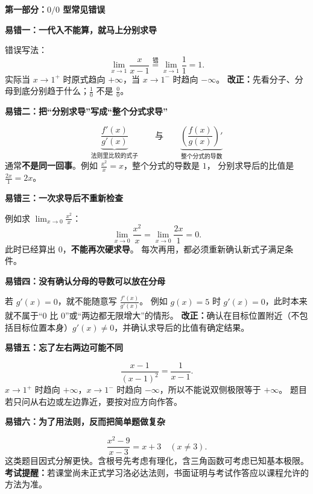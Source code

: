 \clearpage
\begin{trapbox}
\textbf{\textcolor{CTrap}{第一部分：$0/0$ 型常见错误}}



\begin{minipage}{\linewidth}
\textbf{\textcolor{CTrap}{易错一：一代入不能算，就马上分别求导}}
\begin{center}\end{center}
\end{minipage}



错误写法：
\[
\lim_{x\to1}\frac{x}{x-1}
\overset{\text{错}}{=}\lim_{x\to1}\frac11=1.
\]
实际当 $x\to1^+$ 时原式趋向 $+\infty$，当 $x\to1^-$ 时趋向 $-\infty$。
\textbf{改正：}先看分子、分母到底分别趋于什么；$\frac10$ 不是 $\frac00$。

\medskip
\textbf{\textcolor{CTrap}{易错二：把“分别求导”写成“整个分式求导”}}

\[
\underbrace{\frac{f'(x)}{g'(x)}}_{\text{法则里比较的式子}}
\qquad\text{与}\qquad
\underbrace{\left(\frac{f(x)}{g(x)}\right)'}_{\text{整个分式的导数}}
\]
通常\textbf{不是同一回事}。例如 $\frac{x^2}{x}=x$，整个分式的导数是 $1$，
分别求导后的比值是 $\frac{2x}{1}=2x$。

\medskip
\textbf{\textcolor{CTrap}{易错三：一次求导后不重新检查}}

例如求 $\displaystyle\lim_{x\to0}\frac{x^2}{x}$：
\[
\lim_{x\to0}\frac{x^2}{x}
=\lim_{x\to0}\frac{2x}{1}=0.
\]
此时已经算出 $0$，\textbf{不能再次硬求导}。
每次再用，都必须重新确认新式子满足条件。

\medskip
\textbf{\textcolor{CTrap}{易错四：没有确认分母的导数可以放在分母}}

若 $g'(x)=0$，就不能随意写 $\frac{f'(x)}{g'(x)}$。
例如 $g(x)=5$ 时 $g'(x)=0$，此时本来就不属于“$0$ 比 $0$”或“两边都无限增大”的情形。
\textbf{改正：}确认在目标位置附近（不包括目标位置本身）$g'(x)\ne0$，并确认求导后的比值有确定结果。

\medskip
\textbf{\textcolor{CTrap}{易错五：忘了左右两边可能不同}}

\[
\frac{x-1}{(x-1)^2}=\frac1{x-1}.
\]
$x\to1^+$ 时趋向 $+\infty$，$x\to1^-$ 时趋向 $-\infty$，所以不能说双侧极限等于 $+\infty$。
题目若只问从右边或左边靠近，要按对应方向作答。

\medskip
\textbf{\textcolor{CTrap}{易错六：为了用法则，反而把简单题做复杂}}

\[
\frac{x^2-9}{x-3}=x+3\quad(x\ne3).
\]
这类题目因式分解更快。含根号先考虑有理化，含三角函数可考虑已知基本极限。
\textbf{考试提醒：}若课堂尚未正式学习洛必达法则，书面证明与考试作答应以课程允许的方法为准。

\end{trapbox}

